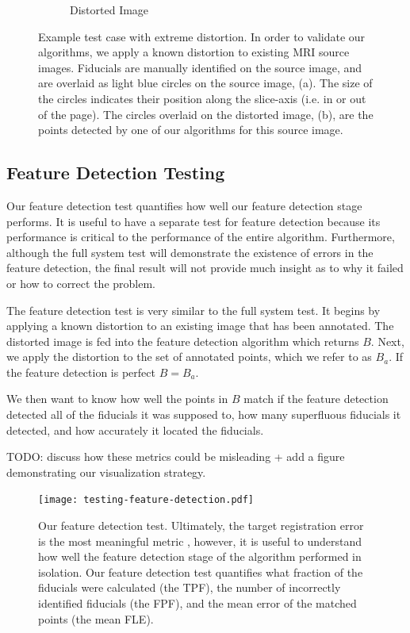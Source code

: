 \documentclass[12pt]{article}
\begin{document}
\begin{figure}
\begin{subfigure}[b]{0.48\textwidth}
        \caption{Distorted Image}
        \label{fig:test-case_2}
    \end{subfigure}
    \caption{Example test case with extreme distortion.  In order to validate our algorithms, we apply a known distortion to existing MRI source images.  Fiducials are manually identified on the source image, and are overlaid as light blue circles on the source image, (a).  The size of the circles indicates their position along the slice-axis (i.e. in or out of the page).  The circles overlaid on the distorted image, (b), are the points detected by one of our algorithms for this source image.}
    \label{fig:test-case}
\end{figure}

\subsection{Feature Detection Testing}

Our feature detection test quantifies how well our feature detection stage performs.  It is useful to have a separate test for feature detection because its performance is critical to the performance of the entire algorithm.  Furthermore, although the full system test will demonstrate the existence of errors in the feature detection, the final result will not provide much insight as to why it failed or how to correct the problem.

The feature detection test is very similar to the full system test.  It begins by applying a known distortion to an existing image that has been annotated.  The distorted image is fed into the feature detection algorithm which returns $B$.  Next, we apply the distortion to the set of annotated points, which we refer to as $B_a$.  If the feature detection is perfect $B = B_a$.

We then want to know how well the points in $B$ match if the feature detection detected all of the fiducials it was supposed to, how many superfluous fiducials it detected, and how accurately it located the fiducials.

TODO: discuss how these metrics could be misleading + add a figure demonstrating our visualization strategy.

\begin{figure}
    \centering
    \texttt{[image: testing-feature-detection.pdf]}
    \caption{Our feature detection test.  Ultimately, the target registration error is the most meaningful metric \cite[page R38]{hill2001}, however, it is useful to understand how well the feature detection stage of the algorithm performed in isolation.  Our feature detection test quantifies what fraction of the fiducials were calculated (the TPF), the number of incorrectly identified fiducials (the FPF), and the mean error of the matched points (the mean FLE).}
    \label{fig:testing-feature-detection}
\end{figure}
\end{document}
